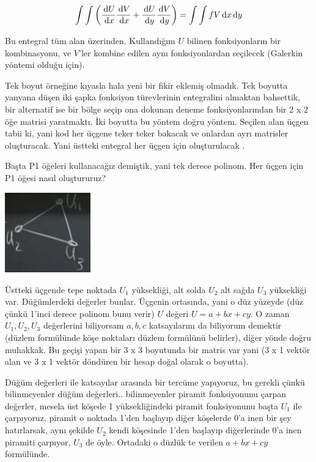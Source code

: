 \documentclass[12pt,fleqn]{article}\usepackage{../../common}
\begin{document}
$$
\int \int
\left(
\frac{\,\mathrm{d} U}{\,\mathrm{d} x} \frac{\,\mathrm{d} V}{\,\mathrm{d} x} +
\frac{\,\mathrm{d} U}{\,\mathrm{d} y} \frac{\,\mathrm{d} V}{\,\mathrm{d} y} 
\right) =
\int \int f V  \,\mathrm{d} x \,\mathrm{d} y
$$

Bu entegral tüm alan üzerinden. Kullandığım $U$ bilinen fonksiyonların bir
kombinasyonu, ve $V$'ler kombine edilen aynı fonksiyonlardan seçilecek (Galerkin
yöntemi olduğu için). 

Tek boyut örneğine kıyasla hala yeni bir fikir eklemiş olmadık. Tek boyutta
yanyana düşen iki şapka fonksiyon türevlerinin entegralini almaktan bahsettik,
bir alternatif ise bir bölge seçip ona dokunan deneme fonksiyonlarından bir 2 x
2 öğe matrisi yaratmaktı. İki boyutta bu yöntem doğru yöntem. Seçilen alan üçgen
tabii ki, yani kod her üçgene teker teker bakacak ve onlardan ayrı matrisler
oluşturacak. Yani üstteki entegral her üçgen için oluşturulacak .

Başta P1 öğeleri kullanacağız demiştik, yani tek derece polinom. Her üçgen
için P1 öğesi nasıl oluştururuz? 

\includegraphics[width=10em]{compscieng_1_27_04.png}

Üstteki üçgende tepe noktada $U_1$ yüksekliği, alt solda $U_2$ alt sağda $U_3$
yüksekliği var. Düğümlerdeki değerler bunlar. Üçgenin ortasında, yani o düz
yüzeyde (düz çünkü 1'inci derece polinom bunu verir) $U$ değeri $U = a+bx+cy$.
O zaman $U_1,U_2,U_3$ değerlerini biliyorsam $a,b,c$ katsayılarını da biliyorum
demektir (düzlem formülünde köşe noktaları düzlem formülünü belirler), diğer
yönde doğru muhakkak. Bu geçişi yapan bir 3 x 3 boyutunda bir matris var yani (3
x 1 vektör alan ve 3 x 1 vektör döndüren bir hesap doğal olarak o boyutta).

Düğüm değerleri ile katsayılar arasında bir tercüme yapıyoruz, bu gerekli çünkü
bilinmeyenler düğüm değerleri.. bilinmeyenler piramit fonksiyonunu çarpan
değerler, mesela üst köşede 1 yüksekliğindeki piramit fonksiyonunu başta $U_1$
ile çarpıyoruz, piramit o noktada 1'den başlayıp diğer köşelerde 0'a inen bir
şey hatırlarsak, aynı şekilde $U_2$ kendi köşesinde 1'den başlayıp diğerlerinde
0'a inen piramiti çarpıyor, $U_3$ de öyle. Ortadaki o düzlük te verilen
$a + bx + cy$ formülünde.
\end{document}
